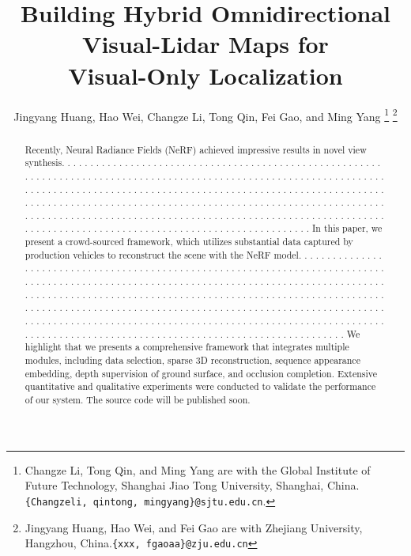 \documentclass[conference]{./support/ieeeconf}
\title{\LARGE \bf  Building Hybrid Omnidirectional Visual-Lidar Maps for \\ Visual-Only Localization}
\author{Jingyang Huang, Hao Wei, Changze Li, Tong Qin, Fei Gao, and Ming Yang
\thanks{Changze Li, Tong Qin, and Ming Yang are with the Global Institute of Future Technology, Shanghai Jiao Tong University, Shanghai, China.
		{\tt\small  \{Changzeli, qintong, mingyang\}@sjtu.edu.cn}. 
}
\thanks{ Jingyang Huang, Hao Wei, and Fei Gao are with Zhejiang University, Hangzhou, China.{\tt\small  \{xxx, fgaoaa\}@zju.edu.cn}}
 }
\begin{document}
\maketitle
\thispagestyle{empty}
\pagestyle{empty}

\begin{abstract}
Recently, Neural Radiance Fields (NeRF) achieved impressive results in novel view synthesis.
. . . . . . . . . . . . . . . . . . . . . . . . . . . . . . . . . . . . . . . . . . . . . . . . . . . . . . . . . . . . . . . . . . . . . . . . . . . . . . . . . . . . . . . . . . . . . . . . . . . . . . . . . . . . . . . . . . . . . . . . . . . . . . . . . . . . . . . . . . . . . . . . . . . . . . . . . . . . . . . . . . . . . . . . . . . . . . . . . . . . . . . . . . . . . . . . . . . . . . . . . . . . . . . . . . . . . . . . . . . . . . . . . . . . . . . . . . . . . . . . . . . . . . . . . . . . . . . . . . . . . . . . . . . . . . . . . . . . . . . . . . . . . . . . . . . . . . . . . . . . . . . . . . . . . . . . . . . . . . . . . . . . . . . . . . . . . . . . . . . . . . . . . . . . . . . . . . . . . 
In this paper, we present a crowd-sourced framework, which utilizes substantial data captured by production vehicles to reconstruct the scene with the NeRF model.
. . . . . . . . . . . . . . . . . . . . . . . . . . . . . . . . . . . . . . . . . . . . . . . . . . . . . . . . . . . . . . . . . . . . . . . . . . . . . . . . . . . . . . . . . . . . . . . . . . . . . . . . . . . . . . . . . . . . . . . . . . . . . . . . . . . . . . . . . . . . . . . . . . . . . . . . . . . . . . . . . . . . . . . . . . . . . . . . . . . . . . . . . . . . . . . . . . . . . . . . . . . . . . . . . . . . . . . . . . . . . . . . . . . . . . . . . . . . . . . . . . . . . . . . . . . . . . . . . . . . . . . . . . . . . . . . . . . . . . . . . . . . . . . . . . . . . . . . . . . . . . . . . . . . . . . . . . . . . . . . . . . . . . . . . . . . . . . . . . . . . . . . . . . . . . . . . . . . . . . . . . . . . . . . . . . . . . . . . . . . . . . . . 
We highlight that we presents a comprehensive framework that integrates multiple modules, including data selection, sparse 3D reconstruction, sequence appearance embedding, depth supervision of ground surface, and occlusion completion. 
Extensive quantitative and qualitative experiments were conducted to validate the performance of our system.
The source code will be published soon.
\end{abstract}
\end{document}
